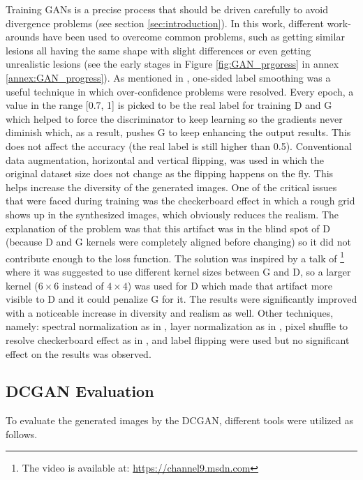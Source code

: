 \documentclass[final,3p,twocolumn,authoryear,sort&compress,times]{maia}
\begin{document}
Training GANs is a precise process that should be driven carefully to avoid divergence problems (see section \ref{sec:introduction}). In this work, different work-arounds have been used to overcome common problems, such as getting similar lesions all having the same shape with slight differences or even getting unrealistic lesions (see the early stages in Figure \ref{fig:GAN_prgoress} in annex \ref{annex:GAN_progress}). 
As mentioned in \citet{GANtraining_techniques}, one-sided label smoothing was a useful technique in which over-confidence problems were resolved. Every epoch, a value in the range [0.7, 1] is picked to be the real label for training D and G which helped to force the discriminator to keep learning so the gradients never diminish which, as a result, pushes G to keep enhancing the output results. This does not affect the accuracy (the real label is still higher than 0.5). Conventional data augmentation, horizontal and vertical flipping, was used in which the original dataset size does not change as the flipping happens on the fly. This helps increase the diversity of the generated images. One of the critical issues that were faced during training was the checkerboard effect in which a rough grid shows up in the synthesized images, which obviously reduces the realism. The explanation of the problem was that this artifact was in the blind spot of D (because D and G kernels were completely aligned before changing) so it did not contribute enough to the loss function. The solution was inspired by a talk of \citet{nips2016} \footnote{The video is available at: \href{https://channel9.msdn.com/Events/Neural-Information-Processing-Systems-Conference/Neural-Information-Processing-Systems-Conference-NIPS-2016/Generative-Adversarial-Networks}{https://channel9.msdn.com}} where it was suggested to use different kernel sizes between G and D, so a larger kernel ($6 \times 6$ instead of $4 \times 4$) was used for D which made that artifact more visible to D and it could penalize G for it. The results were significantly improved with a noticeable increase in diversity and realism as well.
Other techniques, namely: spectral normalization as in \citet{miyato2018spectral}, layer normalization as in \citet{layer_norm}, pixel shuffle to resolve checkerboard effect as in \citet{pixel_shuffle}, and label flipping were used but no significant effect on the results was observed.

\subsection{DCGAN Evaluation}
\label{sec:evaluation_criteria}
To evaluate the generated images by the DCGAN, different tools were utilized as follows.
\end{document}
